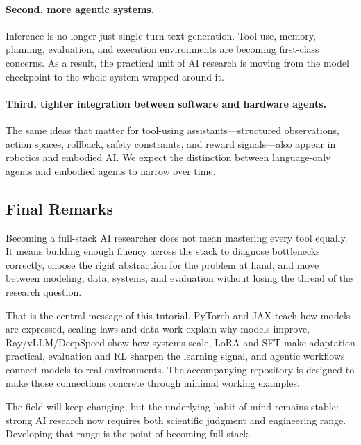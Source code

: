 \documentclass[class=article,crop=false]{standalone}
\begin{document}
\paragraph{Second, more agentic systems.}
Inference is no longer just single-turn text generation. Tool use, memory, planning, evaluation, and execution environments are becoming first-class concerns. As a result, the practical unit of AI research is moving from the model checkpoint to the whole system wrapped around it.

\paragraph{Third, tighter integration between software and hardware agents.}
The same ideas that matter for tool-using assistants---structured observations, action spaces, rollback, safety constraints, and reward signals---also appear in robotics and embodied AI. We expect the distinction between language-only agents and embodied agents to narrow over time.

\subsection{Final Remarks}
\label{sec:conclusion:final}

Becoming a full-stack AI researcher does not mean mastering every tool equally. It means building enough fluency across the stack to diagnose bottlenecks correctly, choose the right abstraction for the problem at hand, and move between modeling, data, systems, and evaluation without losing the thread of the research question.

That is the central message of this tutorial. PyTorch and JAX teach how models are expressed, scaling laws and data work explain why models improve, Ray/vLLM/DeepSpeed show how systems scale, LoRA and SFT make adaptation practical, evaluation and RL sharpen the learning signal, and agentic workflows connect models to real environments. The accompanying repository is designed to make those connections concrete through minimal working examples.

The field will keep changing, but the underlying habit of mind remains stable: strong AI research now requires both scientific judgment and engineering range. Developing that range is the point of becoming full-stack.
\end{document}

